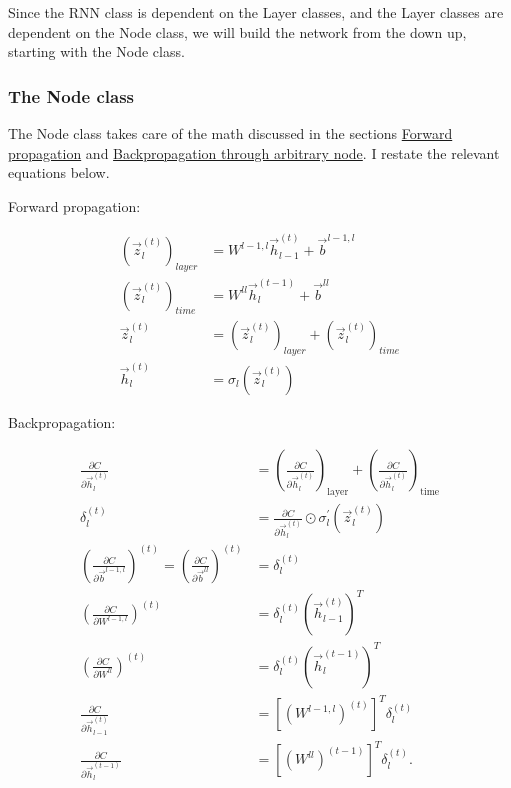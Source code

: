 \documentclass[11pt]{article}
\begin{document}
    Since the RNN class is dependent on the Layer classes, and the Layer
classes are dependent on the Node class, we will build the network from
the down up, starting with the Node class.

    \subsubsection{The Node class}\label{the-node-class}

    The Node class takes care of the math discussed in the sections
\hyperref[forward-propagation]{Forward propagation} and
\hyperref[backpropagation-through-arbitrary-node]{Backpropagation through arbitrary node}.
I restate the relevant equations below.

    Forward propagation:

\begin{align*}
\left( \vec{z}_l^{(t)} \right)_{layer} &= W^{l-1,l} \vec{h}_{l-1}^{(t)} + \vec{b}^{l-1,l}
\\[4ex]
\left( \vec{z}_l^{(t)} \right)_{time} &= W^{ll} \vec{h}_{l}^{(t-1)} + \vec{b}^{ll}
\\[4ex]
\vec{z}_l^{(t)} &= \left( \vec{z}_l^{(t)} \right)_{layer} + \left( \vec{z}_l^{(t)} \right)_{time}
\\[4ex]
\vec{h}_l^{(t)} &= \sigma_l \left( \vec{z}_l^{(t)} \right)
\end{align*}

    Backpropagation:

\begin{align*}
\frac{\partial C}{\partial \vec{h}_l^{(t)}} &= \left( \frac{\partial C}{\partial \vec{h}_l^{(t)}} \right)_\text{layer} + \left( \frac{\partial C}{\partial \vec{h}_l^{(t)}} \right)_\text{time}
\\[4ex]
\delta_l^{(t)} &= \frac{\partial C}{\partial \vec{h}_l^{(t)}} \odot \sigma_l^\prime \left(\vec{z}_l^{(t)} \right)
\\[4ex]
\left( \frac{\partial C}{\partial \vec{b}^{l-1,l}} \right)^{(t)} = \left( \frac{\partial C}{\partial \vec{b}^{ll}} \right)^{(t)} &= \delta_l^{(t)}
\\[4ex]
\left( \frac{\partial C}{\partial W^{l-1,l}} \right)^{(t)} &= \delta_l^{(t)} \left( \vec{h}_{l-1}^{(t)} \right)^T
\\[4ex]
\left( \frac{\partial C}{\partial W^{ll}} \right)^{(t)} &= \delta_l^{(t)} \left( \vec{h}_l^{(t-1)} \right)^T
\\[4ex]
\frac{\partial C}{\partial \vec{h}_{l-1}^{(t)}} &= \left[ \left( W^{l-1,l} \right)^{(t)} \right]^T \delta_l^{(t)}
\\[4ex]
\frac{\partial C}{\partial \vec{h}_{l}^{(t-1)}} &= \left[ \left( W^{ll} \right)^{(t-1)} \right]^T \delta_l^{(t)}.
\end{align*}
\end{document}
